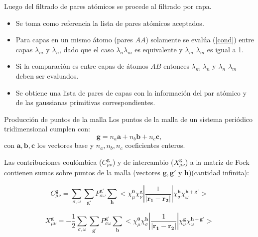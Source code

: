 \documentclass[dvisvgm,11pt,aspectratio=169]{beamer}
\begin{document}
\begin{frame}
	Luego del filtrado de pares atómicos se procede al filtrado por capa.
	\begin{itemize}
		\item Se toma como referencia la lista de pares atómicos aceptados.
		\item Para capas en un mismo átomo (pares $AA$) solamente se evalúa (\ref{cond}) entre capas $\lambda_m$ y $\lambda_n$, dado que el caso $\lambda_n \lambda_m$ es equivalente y $\lambda_m$ $\lambda_m$ es igual a 1. 
		\item Si la comparación es entre capas de átomos $AB$ entonces $\lambda_m$ $\lambda_n$ y $\lambda_n$ $\lambda_m$ deben ser evaluados. 
		\item Se obtiene una lista de pares de capas con la información del par atómico y de las gaussianas primitivas correspondientes.
	\end{itemize}
\end{frame}

\begin{frame}{Producción de puntos de la malla}
Los puntos de la malla de un sistema periódico tridimensional cumplen con:
\begin{equation}
    \mathbf{g} = n_a \mathbf{a} + n_b \mathbf{b} + n_c \mathbf{c},
\end{equation}
con $\mathbf{a,b,c}$ los vectores base y $n_a,n_b,n_c$ coeficientes enteros. 

Las contribuciones coulómbica ($C_{\mu \nu}^\mathbf{g}$) y de intercambio ($X_{\mu \nu}^\mathbf{g}$) a la matriz de Fock contienen sumas sobre puntos de la malla (vectores $\mathbf{g,g'}$ y $\mathbf{h}$)(cantidad infinita):

\begin{equation}\label{C12}
C_{\mu \nu}^\mathbf{g} =\sum_{\sigma , \omega} \sum_{\mathbf{g'}} P_{\sigma \omega}^{\mathbf{g'}} \sum_\mathbf{h}  <\chi_\mu^\mathbf{0} \chi_\nu^\mathbf{g}|\frac{1}{|\mathbf{r_1-r_2}|}|\chi_\sigma^\mathbf{h} \chi_\omega^{\mathbf{h+g'}}> 
\end{equation}

\begin{equation}\label{X12}
X_{\mu \nu}^\mathbf{g} =-\frac{1}{2} \sum_{\sigma , \omega} \sum_{\mathbf{g'}} P_{\sigma \omega}^{\mathbf{g'}} \sum_\mathbf{h}  <\chi_\mu^\mathbf{0} \chi_\sigma^\mathbf{h}|\frac{1}{|\mathbf{r_1-r_2}|}|\chi_\nu^\mathbf{g} \chi_\omega^{\mathbf{h+g'}}>
\end{equation}

\end{frame}
\end{document}

